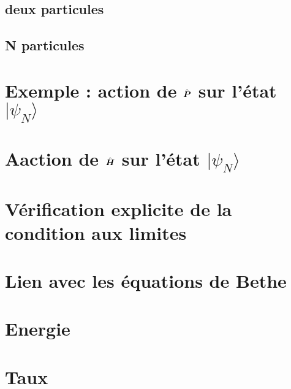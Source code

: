 \section{deux particules}\label{annex:2.part}

\section{N particules}\label{annex:N.part}


\chapter{Exemple : action de $\hat{\bm{P}}$ sur l’état $\vert \psi_N\rangle$}
%

\chapter{Aaction de $\hat{\bm{H}}$ sur l’état $\vert \psi_N\rangle$}
%

\chapter{Vérification explicite de la condition aux limites}
%
\chapter{Lien avec les équations de Bethe}
%

\chapter{Energie}

\chapter{Taux}



\newpage
\printindex
\printindex[pers]
			            
